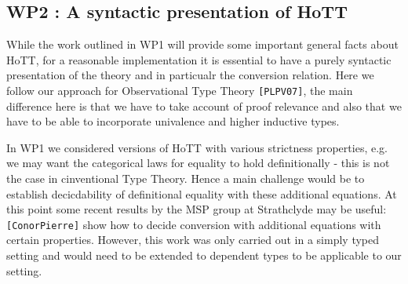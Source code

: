 \documentclass[twocolumn,a4paper,11pt]{article}
\renewcommand{\cite}[1]{{\tt[#1]}}
\begin{document}



\subsection*{WP2 : A syntactic presentation of HoTT}

While the work outlined in WP1 will provide some important general
facts about HoTT, for a reasonable implementation it is essential to
have a purely syntactic presentation of the theory and in particualr
the conversion relation. Here we follow our approach for Observational
Type Theory \cite{PLPV07}, the main difference here is that we have to
take account of proof relevance and also that we have to be able to
incorporate univalence and higher inductive types. 

In WP1 we considered versions of HoTT with various strictness
properties, e.g. we may want the categorical laws for equality to hold
definitionally - this is not the case in cinventional Type
Theory. Hence a main challenge would be to establish decicdability of
definitional equality with these additional equations. At this point
some recent results by the MSP group at Strathclyde may be useful: \cite{ConorPierre}
show how to decide conversion with additional equations with certain
properties. However, this work was only carried out in a simply typed
setting and would need to be extended to dependent types to be
applicable to our setting.
\end{document}
